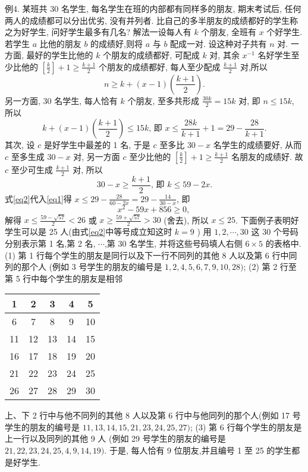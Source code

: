 例4. 某班共 30 名学生, 每名学生在班的内部都有同样多的朋友, 期末考试后, 任何两人的成绩都可以分出优劣, 没有并列者.
比自己的多半朋友的成绩都好的学生称之为好学生, 问好学生最多有几名?
解法一设每人有 $k$ 个朋友, 全班有 $x$ 个好学生.
若学生 $a$ 比他的朋友 $b$ 的成绩好,则将 $a$ 与 $b$ 配成一对.
设这种对子共有 $n$ 对.
一方面, 最好的学生比他的 $k$ 个朋友的成绩都好, 可配成 $k$ 对, 其余 $x^{-1}$ 名好学生至少比他的 $\left[\frac{k}{2}\right]+1 \geqslant \frac{k+1}{2}$ 个朋友的成绩都好, 每人至少配成 $\frac{k+1}{2}$ 对,所以
$$
n \geqslant k+(x-1)\left(\frac{k+1}{2}\right) .
$$
另一方面, 30 名学生, 每人恰有 $k$ 个朋友, 至多共形成 $\frac{30 k}{2}=15 k$ 对, 即 $n \leqslant 15 k$, 所以
$$
k+(x-1)\left(\frac{k+1}{2}\right) \leqslant 15 k \text {, 即 } x \leqslant \frac{28 k}{k+1}+1=29-\frac{28}{k+1} . \label{eq1}
$$
其次, 设 $c$ 是好学生中最差的 1 名, 于是 $c$ 至多比 $30-x$ 名学生的成绩要好, 从而 $c$ 至多生成 $30-x$ 对, 另一方面 $c$ 至少比他的 $\left[\frac{k}{2}\right]+1 \geqslant \frac{k+1}{2}$ 名朋友的成绩好.
故 $c$ 至少可生成 $\frac{k+1}{2}$ 对, 所以
$$
30-x \geqslant \frac{k+1}{2} \text {, 即 } k \leqslant 59-2 x . \label{eq2}
$$
式\ref{eq2}代入\ref{eq1}得 $x \leqslant 29-\frac{28}{60-2 x}=29-\frac{14}{30-x}$, 即
$$
x^2-59 x+856 \geqslant 0 \text {, }
$$
解得 $x \leqslant \frac{59-\sqrt{57}}{2}<26$ 或 $x \geqslant \frac{59+\sqrt{57}}{2}>30$ (舍去), 所以 $x \leqslant 25$.
下面例子表明好学生可以是 25 人(由式\ref{eq2}中等号成立知这时 $k=9$ )
用 $1,2, \cdots, 30$ 这 30 个号码分别表示第 1 名,第 2 名, $\cdots$,第 30 名学生, 并将这些号码填人右侧 $6 \times 5$ 的表格中.
(1) 第 1 行每个学生的朋友是同行以及下一行不同列的其他 8 人以及第 6 行中同列的那个人 (例如 3 号学生的朋友的编号是 $1,2,4,5,6,7,9,10,28)$;
(2) 第 2 行至第 5 行中每个学生的朋友是相邻
\begin{tabular}{|c|c|c|c|c|}
\hline 1 & 2 & 3 & 4 & 5 \\
\hline 6 & 7 & 8 & 9 & 10 \\
\hline 11 & 12 & 13 & 14 & 15 \\
\hline 16 & 17 & 18 & 19 & 20 \\
\hline 21 & 22 & 23 & 24 & 25 \\
\hline 26 & 27 & 28 & 29 & 30 \\
\hline
\end{tabular}
上、下 2 行中与他不同列的其他 8 人以及第 6 行中与他同列的那个人(例如 17 号学生的朋友的编号是 $11,13,14,15,21,23,24,25,27)$;
(3) 第 6 行每个学生的朋友是上一行以及同列的其他 9 人 (例如 29 号学生的朋友的编号是 $21,22,23,24,25,4,9,14,19)$.
于是, 每人恰有 9 位朋友,并且编号 1 至 25 的学生都是好学生.



